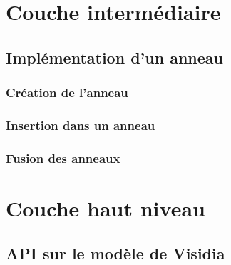 \documentclass[a4paper,10pt]{report}
\begin{document}
  \section{Couche intermédiaire}
    \subsection{Implémentation d'un anneau}
      \subsubsection{Création de l'anneau}
      \subsubsection{Insertion dans un anneau}
      \subsubsection{Fusion des anneaux}
  \section{Couche haut niveau}
    \subsection{API sur le modèle de Visidia}
\end{document}
